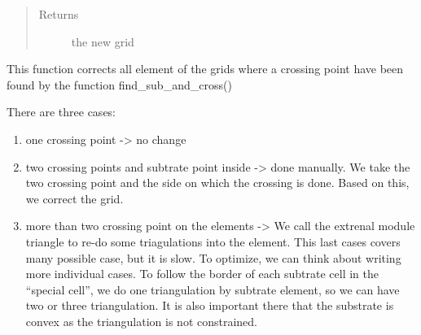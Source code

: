 \documentclass[letterpaper,10pt,english]{sphinxmanual}
\begin{document}
\begin{fulllineitems}
\begin{quote}
\begin{description}
\item[{Returns}] \leavevmode
the new grid

\end{description}\end{quote}


This function corrects all element of the grids where a crossing point have been found by the
function find\_sub\_and\_cross()

There are three cases:
\begin{enumerate}
\item {} 
one crossing point -\textgreater{} no change

\item {} 
two crossing points and subtrate point inside -\textgreater{} done manually. We take the two crossing point and the side on
which the crossing is done. Based on this, we correct the grid.

\item {} 
more than two crossing point on the elements -\textgreater{} We call the extrenal module
triangle to re-do some triagulations into the element. This last cases covers many possible case, but it is slow.
To optimize, we can think about writing more individual cases. To follow the border of each subtrate cell in
the ``special cell'', we do one triangulation by subtrate element, so we can have two or three triangulation.
It is also important there that the substrate is convex as the triangulation is not constrained.

\end{enumerate}

\end{fulllineitems}

\end{document}
